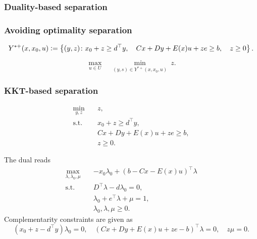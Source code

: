 
\subsubsection*{Duality-based separation}


\subsubsection{Avoiding optimality separation}


\begin{equation*}
    Y^{*+}(x,x_0,u) \mathrel{{\mathop:}{=}} 
    \left\{
        (y,z)
    \colon
        x_0 + z \ge d^\top y, \quad
        Cx + Dy + E(x)u + ze \ge b, \quad
        z \ge 0
    \right\}.
\end{equation*}

\begin{equation*}
    \max_{u\in U} \quad \min_{(y,s)\in Y^{*+}(x,x_0,u)} \ z.
\end{equation*}

\subsubsection*{KKT-based separation}

\begin{subequations}
    \begin{align}
        \min_{y,z} \quad & z, \\
        \text{s.t.} \quad & x_0 + z \ge d^\top y, \\
        & Cx + Dy + E(x)u + ze \ge b, \\
        & z \ge 0.
    \end{align}
\end{subequations}

The dual reads 
\begin{subequations}
    \label{eq:ccg:farkas}
    \begin{align}
        \max_{\lambda,\lambda_0,\mu} \quad & -x_0\lambda_0 + (b - Cx - E(x)u)^\top \lambda \\
        \text{s.t.} \quad & D^\top\lambda - d\lambda_0 = 0, \\
        & \lambda_0 + e^\top\lambda + \mu = 1, \\
        & \lambda_0, \lambda, \mu \ge 0.
    \end{align}
\end{subequations}
Complementarity constraints are given as 
\begin{equation*}
    (x_0 + z - d^\top y)\lambda_0 = 0, \quad 
    (Cx + Dy + E(x)u + ze - b)^\top \lambda = 0, \quad 
    z\mu = 0.
\end{equation*}

